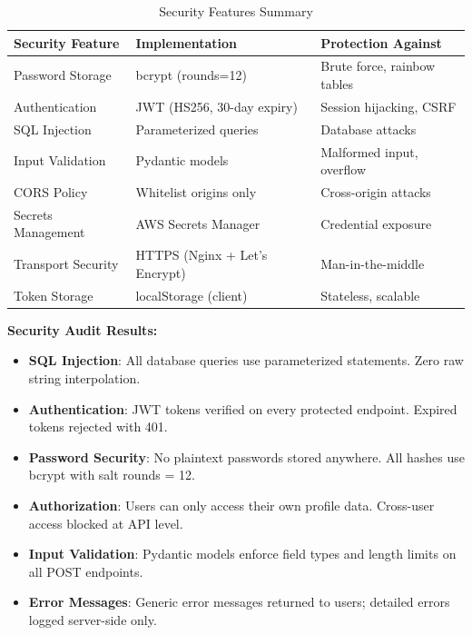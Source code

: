 \documentclass[12pt,a4paper]{report}
\begin{document}
\begin{table}[H]
\centering
\caption{Security Features Summary}
\begin{tabular}{|p{4cm}|p{4cm}|p{4.5cm}|}
\hline
\textbf{Security Feature} & \textbf{Implementation} & \textbf{Protection Against} \\
\hline
Password Storage & bcrypt (rounds=12) & Brute force, rainbow tables \\
\hline
Authentication & JWT (HS256, 30-day expiry) & Session hijacking, CSRF \\
\hline
SQL Injection & Parameterized queries & Database attacks \\
\hline
Input Validation & Pydantic models & Malformed input, overflow \\
\hline
CORS Policy & Whitelist origins only & Cross-origin attacks \\
\hline
Secrets Management & AWS Secrets Manager & Credential exposure \\
\hline
Transport Security & HTTPS (Nginx + Let's Encrypt) & Man-in-the-middle \\
\hline
Token Storage & localStorage (client) & Stateless, scalable \\
\hline
\end{tabular}
\end{table}

\textbf{Security Audit Results:}
\begin{itemize}
    \item \textbf{SQL Injection}: All database queries use parameterized statements. Zero raw string interpolation.
    \item \textbf{Authentication}: JWT tokens verified on every protected endpoint. Expired tokens rejected with 401.
    \item \textbf{Password Security}: No plaintext passwords stored anywhere. All hashes use bcrypt with salt rounds = 12.
    \item \textbf{Authorization}: Users can only access their own profile data. Cross-user access blocked at API level.
    \item \textbf{Input Validation}: Pydantic models enforce field types and length limits on all POST endpoints.
    \item \textbf{Error Messages}: Generic error messages returned to users; detailed errors logged server-side only.
\end{itemize}

\end{document}
